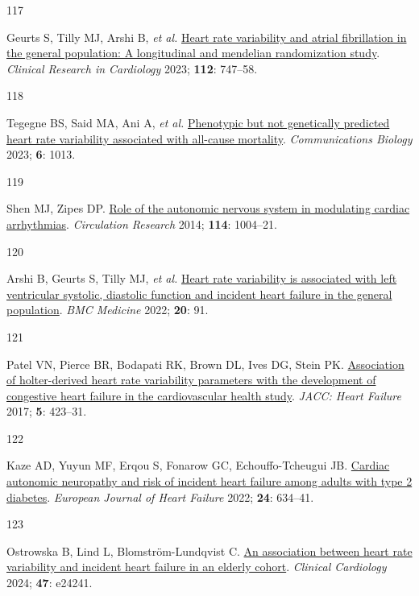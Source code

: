 \documentclass[
  letterpaper,
  headsepline=true,
  open=any]{scrbook}
\newlength{\cslhangindent}
\newlength{\csllabelwidth}
\newlength{\cslentryspacingunit} %
\newenvironment{CSLReferences}[2] %
 {%
  \setlength{\parindent}{0pt}
  \ifodd #1
  \let\oldpar\par
  \def\par{\hangindent=\cslhangindent\oldpar}
  \fi
  \setlength{\parskip}{#2\cslentryspacingunit}
 }%
 {}
\newcommand{\CSLLeftMargin}[1]{\parbox[t]{\csllabelwidth}{#1}}
\newcommand{\CSLRightInline}[1]{\parbox[t]{\linewidth - \csllabelwidth}{#1}\break}
\begin{document}
\begin{CSLReferences}{0}{0}
\leavevmode{}%
\CSLLeftMargin{117 }%
\CSLRightInline{Geurts S, Tilly MJ, Arshi B, \emph{et al.}
\href{https://doi.org/10.1007/s00392-022-02072-5}{Heart rate variability
and atrial fibrillation in the general population: A longitudinal and
mendelian randomization study}. \emph{Clinical Research in Cardiology}
2023; \textbf{112}: 747--58.}

\leavevmode{}%
\CSLLeftMargin{118 }%
\CSLRightInline{Tegegne BS, Said MA, Ani A, \emph{et al.}
\href{https://doi.org/10.1038/s42003-023-05376-y}{Phenotypic but not
genetically predicted heart rate variability associated with all-cause
mortality}. \emph{Communications Biology} 2023; \textbf{6}: 1013.}

\leavevmode{}%
\CSLLeftMargin{119 }%
\CSLRightInline{Shen MJ, Zipes DP.
\href{https://doi.org/10.1161/CIRCRESAHA.113.302549}{Role of the
autonomic nervous system in modulating cardiac arrhythmias}.
\emph{Circulation Research} 2014; \textbf{114}: 1004--21.}

\leavevmode{}%
\CSLLeftMargin{120 }%
\CSLRightInline{Arshi B, Geurts S, Tilly MJ, \emph{et al.}
\href{https://doi.org/10.1186/s12916-022-02273-9}{Heart rate variability
is associated with left ventricular systolic, diastolic function and
incident heart failure in the general population}. \emph{BMC Medicine}
2022; \textbf{20}: 91.}

\leavevmode{}%
\CSLLeftMargin{121 }%
\CSLRightInline{Patel VN, Pierce BR, Bodapati RK, Brown DL, Ives DG,
Stein PK. \href{https://doi.org/10.1016/j.jchf.2016.12.015}{Association
of holter-derived heart rate variability parameters with the development
of congestive heart failure in the cardiovascular health study}.
\emph{JACC: Heart Failure} 2017; \textbf{5}: 423--31.}

\leavevmode{}%
\CSLLeftMargin{122 }%
\CSLRightInline{Kaze AD, Yuyun MF, Erqou S, Fonarow GC,
Echouffo-Tcheugui JB. \href{https://doi.org/10.1002/ejhf.2432}{Cardiac
autonomic neuropathy and risk of incident heart failure among adults
with type 2 diabetes}. \emph{European Journal of Heart Failure} 2022;
\textbf{24}: 634--41.}

\leavevmode{}%
\CSLLeftMargin{123 }%
\CSLRightInline{Ostrowska B, Lind L, Blomström-Lundqvist C.
\href{https://doi.org/10.1002/clc.24241}{An association between heart
rate variability and incident heart failure in an elderly cohort}.
\emph{Clinical Cardiology} 2024; \textbf{47}: e24241.}


\end{CSLReferences}
\end{document}
